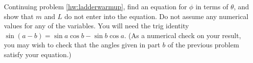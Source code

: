 Continuing problem \ref{hw:ladderwarmup}, find an equation for
$\phi $ in terms of $\theta $, and show that $m$ and $L$ do
not enter into the equation. Do not assume any numerical
values for any of the variables. You will need the trig
identity $\sin (a-b)=\sin a \cos b - \sin b \cos a$.
(As a numerical check on your result, you may wish to
check that the angles given in part $b$ of the previous
problem satisfy your equation.)
\answercheck
